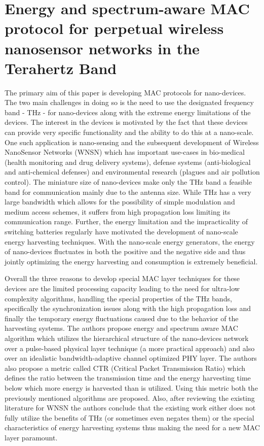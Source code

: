 \documentclass[12pt, letterpaper]{article}
\begin{document}
\section{Energy and spectrum-aware MAC protocol for perpetual wireless nanosensor networks in the Terahertz Band \cite{wang2013energy}}  
\par
The primary aim of this paper is developing MAC protocols for nano-devices. The two main challenges in doing so is the need to use the designated frequency band - THz - for nano-devices along with the extreme energy limitations of the devices. The interest in the devices is motivated by the fact that these devices can provide very specific functionality and the ability to do this at a nano-scale. One such application is nano-sensing and the subsequent development of Wireless NanoSensor Networks (WNSN) which has important use-cases in bio-medical (health monitoring and drug delivery systems), defense systems (anti-biological and anti-chemical defenses) and environmental research (plagues and air pollution control). The miniature size of nano-devices make only the THz band a feasible band for communication mainly due to the antenna size. While THz has a very large bandwidth which allows for the possibility of simple modulation and medium access schemes, it suffers from high propagation loss limiting its communication range. Further, the energy limitation and the impracticality of switching batteries regularly have motivated the development of nano-scale energy harvesting techniques. With the nano-scale energy generators, the energy of nano-devices fluctuates in both the positive and the negative side and thus jointly optimizing the energy harvesting and consumption is extremely beneficial.
\par
Overall the three reasons to develop special MAC layer techniques for these devices are the limited processing capacity leading to the need for ultra-low complexity algorithms, handling the special properties of the THz bands, specifically the synchronization issues along with the high propagation loss and finally the temporary energy fluctuations caused due to the behavior of the harvesting systems. The authors propose energy and spectrum aware MAC algorithm which utilizes the hierarchical structure of the nano-devices network over a pulse-based physical layer technique (a more practical approach) and also over an idealistic bandwidth-adaptive channel optimized PHY layer. The authors also propose a metric called CTR (Critical Packet Transmission Ratio) which defines the ratio between the transmission time and the energy harvesting time below which more energy is harvested than is utilized. Using this metric both the previously mentioned algorithms are proposed. Also, after reviewing the existing literature for WNSN the authors conclude that the existing work either does not fully utilize the benefits of THz (or sometimes even negates them) or the special characteristics of energy harvesting systems thus making the need for a new MAC layer paramount.
\end{document}
